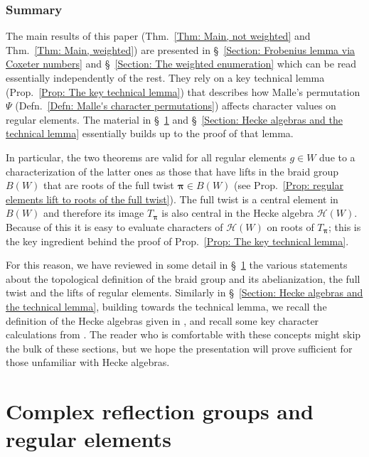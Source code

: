 \subsubsection*{Summary}

The main results of this paper (Thm.~\ref{Thm: Main, not weighted} and Thm.~\ref{Thm: Main, weighted}) are presented in \S~\ref{Section: Frobenius lemma via Coxeter numbers} and \S~\ref{Section: The weighted enumeration} which can be read essentially independently of the rest. They rely on a key technical lemma (Prop.~\ref{Prop: The key technical lemma}) that describes how Malle's permutation $\Psi$ (Defn.~\ref{Defn: Malle's character permutations}) affects character values on regular elements. The material in \S~\ref{Section: Complex reflection groups and regular elements} and \S~\ref{Section: Hecke algebras and the technical lemma} essentially builds up to the proof of that lemma.

In particular, the two theorems are valid for all regular elements $g\in W$ due to a characterization of the latter ones as those that have lifts in the braid group $B(W)$ that are roots of the full twist $\bm\pi\in B(W)$ (see Prop.~\ref{Prop: regular elements lift to roots of the full twist}). The full twist is a central element in $B(W)$ and therefore its image $T_{\bm\pi}$ is also central in the Hecke algebra $\mathcal{H}(W)$. Because of this it is easy to evaluate characters of $\mathcal{H}(W)$ on roots of $T_{\bm\pi}$; this is the key ingredient behind the proof of Prop.~\ref{Prop: The key technical lemma}. 

For this reason, we have reviewed in some detail in \S~\ref{Section: Complex reflection groups and regular elements} the various statements about the topological definition of the braid group and its abelianization, the full twist and the lifts of regular elements. Similarly in \S~\ref{Section: Hecke algebras and the technical lemma}, building towards the technical lemma, we recall the definition of the Hecke algebras given in \cite{broue-malle-rouquier-braid-hecke}, and recall some key character calculations from \cite{broue-michel-french-paper}. The reader who is comfortable with these concepts might skip the bulk of these sections, but we hope the presentation will prove sufficient for those unfamiliar with Hecke algebras.

\section{Complex reflection groups and regular elements}
\label{Section: Complex reflection groups and regular elements}


